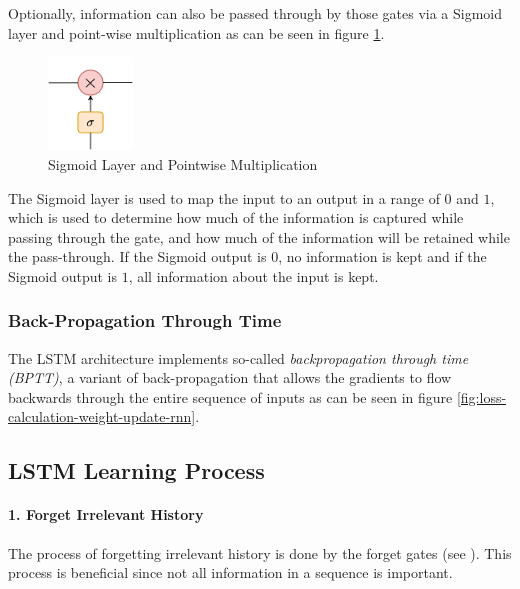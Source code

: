                 Optionally, information can also be passed through by those gates via a Sigmoid layer and point-wise multiplication as can be seen in figure \ref{fig:sigmoid-layer-and-pointwise-multiplication}.
                \begin{figure}[h!]
                    \centering
                    \includegraphics[width=0.2\textwidth]{figures/sigmoid_layer.drawio.png}
                    \caption{Sigmoid Layer and Pointwise Multiplication}
                    \label{fig:sigmoid-layer-and-pointwise-multiplication}
                \end{figure}
                The Sigmoid layer is used to map the input to an output in a range of $0$ and $1$, which is used to determine how much of the information is captured while passing through the gate, and how much of the information will be retained while the pass-through.
                If the Sigmoid output is $0$, no information is kept and if the Sigmoid output is $1$, all information about the input is kept.

            \subsubsection{Back-Propagation Through Time}
            \label{sec:back-propagation-through-time}

                The LSTM architecture implements so-called \emph{backpropagation through time (BPTT)}, a variant of back-propagation that allows the gradients to flow backwards through the entire sequence of inputs as can be seen in figure \ref{fig:loss-calculation-weight-update-rnn}.

            
    \subsection{LSTM Learning Process} %

        \paragraph{1. Forget Irrelevant History}

            The process of forgetting irrelevant history is done by the forget gates (see ).
            This process is beneficial since not all information in a sequence is important. 

